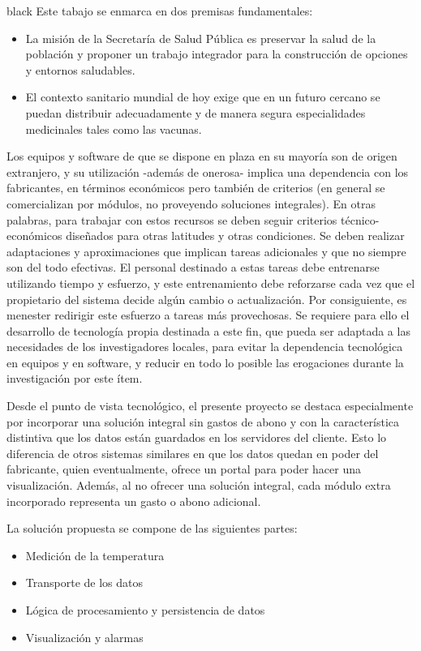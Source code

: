 \documentclass[11pt]{charter}
\begin{document}
\begin{consigna}{black}
Este tabajo se enmarca en dos premisas fundamentales:
\begin{itemize}
\item La misión de la Secretaría de Salud Pública es preservar la salud de la población y proponer un trabajo integrador para la construcción de opciones y entornos saludables.
\item El contexto sanitario mundial de hoy exige que en un futuro cercano se puedan distribuir adecuadamente y de manera segura especialidades medicinales tales como las vacunas.
\end{itemize}
Los equipos y software de que se dispone en plaza en su mayoría son de origen extranjero, y su utilización -además de onerosa- implica una dependencia con los fabricantes, en términos económicos pero también de criterios (en general se comercializan por módulos, no proveyendo soluciones integrales). En otras palabras, para trabajar con estos recursos se deben seguir criterios técnico-económicos diseñados para otras latitudes y otras condiciones. Se deben realizar adaptaciones y aproximaciones que implican tareas adicionales y que no siempre son del todo efectivas. El personal destinado a estas tareas debe entrenarse utilizando tiempo y esfuerzo, y este entrenamiento debe reforzarse cada vez que el propietario del sistema decide algún cambio o actualización. Por consiguiente, es menester redirigir este esfuerzo a tareas más provechosas.
Se requiere para ello el desarrollo de tecnología propia destinada a este fin, que pueda ser adaptada a las necesidades de los investigadores locales, para evitar la dependencia tecnológica en equipos y en software, y reducir en todo lo posible las erogaciones durante la investigación por este ítem.

Desde el punto de vista tecnológico, el presente proyecto se destaca especialmente por incorporar una solución integral sin gastos de abono y con la característica distintiva que los datos están guardados en los servidores del cliente. Esto lo diferencia de otros sistemas similares en que los datos quedan en poder del fabricante, quien eventualmente, ofrece un portal para poder hacer una visualización. Además, al no ofrecer una solución integral, cada módulo extra incorporado representa un gasto o abono adicional. 

La solución propuesta se compone de las siguientes partes:
\begin{itemize}
\item Medición de la temperatura
\item Transporte de los datos
\item Lógica de procesamiento y persistencia de datos
\item Visualización y alarmas
\end{itemize}



\end{consigna}
\end{document}
